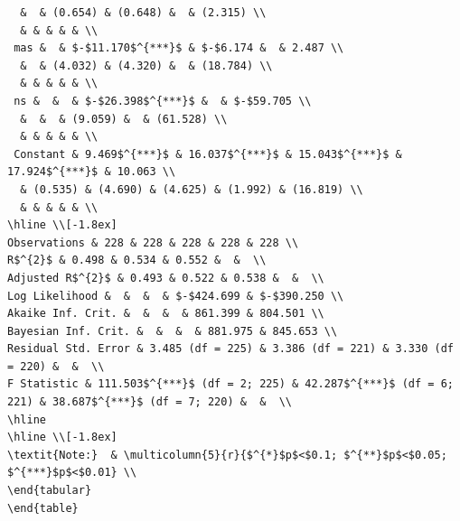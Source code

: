 \documentclass[
]{report}
\begin{document}
\begin{verbatim}
  &  & (0.654) & (0.648) &  & (2.315) \\ 
  & & & & & \\ 
 mas &  & $-$11.170$^{***}$ & $-$6.174 &  & 2.487 \\ 
  &  & (4.032) & (4.320) &  & (18.784) \\ 
  & & & & & \\ 
 ns &  &  & $-$26.398$^{***}$ &  & $-$59.705 \\ 
  &  &  & (9.059) &  & (61.528) \\ 
  & & & & & \\ 
 Constant & 9.469$^{***}$ & 16.037$^{***}$ & 15.043$^{***}$ & 17.924$^{***}$ & 10.063 \\ 
  & (0.535) & (4.690) & (4.625) & (1.992) & (16.819) \\ 
  & & & & & \\ 
\hline \\[-1.8ex] 
Observations & 228 & 228 & 228 & 228 & 228 \\ 
R$^{2}$ & 0.498 & 0.534 & 0.552 &  &  \\ 
Adjusted R$^{2}$ & 0.493 & 0.522 & 0.538 &  &  \\ 
Log Likelihood &  &  &  & $-$424.699 & $-$390.250 \\ 
Akaike Inf. Crit. &  &  &  & 861.399 & 804.501 \\ 
Bayesian Inf. Crit. &  &  &  & 881.975 & 845.653 \\ 
Residual Std. Error & 3.485 (df = 225) & 3.386 (df = 221) & 3.330 (df = 220) &  &  \\ 
F Statistic & 111.503$^{***}$ (df = 2; 225) & 42.287$^{***}$ (df = 6; 221) & 38.687$^{***}$ (df = 7; 220) &  &  \\ 
\hline 
\hline \\[-1.8ex] 
\textit{Note:}  & \multicolumn{5}{r}{$^{*}$p$<$0.1; $^{**}$p$<$0.05; $^{***}$p$<$0.01} \\ 
\end{tabular} 
\end{table} 
\end{verbatim}
\end{document}
